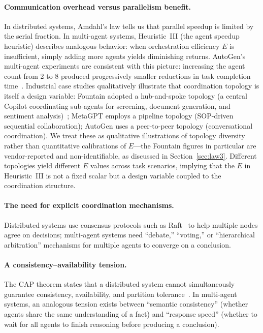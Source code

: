 \paragraph{Communication overhead versus parallelism benefit.}
In distributed systems, Amdahl's law tells us that parallel speedup is limited by the serial fraction.
In multi-agent systems, Heuristic~III (the agent speedup heuristic) describes analogous behavior: when orchestration efficiency $E$ is insufficient, simply adding more agents yields diminishing returns.
AutoGen's multi-agent experiments are consistent with this picture: increasing the agent count from 2 to 8 produced progressively smaller reductions in task completion time~\cite{wu2023autogen}.
Industrial case studies qualitatively illustrate that coordination topology is itself a design variable: Fountain adopted a hub-and-spoke topology (a central Copilot coordinating sub-agents for screening, document generation, and sentiment analysis)~\cite{anthropic2026agenticreport}; MetaGPT employs a pipeline topology (SOP-driven sequential collaboration); AutoGen uses a peer-to-peer topology (conversational coordination). We treat these as qualitative illustrations of topology diversity rather than quantitative calibrations of $E$---the Fountain figures in particular are vendor-reported and non-identifiable, as discussed in Section~\ref{sec:law3}.
Different topologies yield different $E$ values across task scenarios, implying that the $E$ in Heuristic~III is not a fixed scalar but a design variable coupled to the coordination structure.

\paragraph{The need for explicit coordination mechanisms.}
Distributed systems use consensus protocols such as Raft~\cite{raft2014} to help multiple nodes agree on decisions; multi-agent systems need ``debate,'' ``voting,'' or ``hierarchical arbitration'' mechanisms for multiple agents to converge on a conclusion.

\paragraph{A consistency--availability tension.}
The CAP theorem states that a distributed system cannot simultaneously guarantee consistency, availability, and partition tolerance~\cite{cap2002}.
In multi-agent systems, an analogous tension exists between ``semantic consistency'' (whether agents share the same understanding of a fact) and ``response speed'' (whether to wait for all agents to finish reasoning before producing a conclusion).

